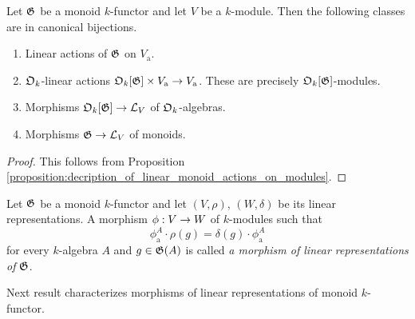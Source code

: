 \begin{corollary}\label{corollary:linear_representations_various_characterizations}
Let ${\mathfrak G}$ be a monoid $k$-functor and let $V$ be a $k$-module. Then the following classes are in canonical bijections.
\begin{enumerate}[label=\emph{\textbf{(\arabic*)}}, leftmargin=1.5em]
\item Linear actions of ${\mathfrak G}$ on $V_{\mathrm{a}}$.
\item ${\mathfrak O}_k$-linear actions ${\mathfrak O}_k[{\mathfrak G}]\times V_{\mathrm{a}}\rightarrow V_{\mathrm{a}}$. These are precisely ${\mathfrak O}_k[{\mathfrak G}]$-modules.
\item Morphisms ${\mathfrak O}_k[{\mathfrak G}]\rightarrow {\mathcal L}_V$ of ${\mathfrak O}_k$-algebras.
\item Morphisms ${\mathfrak G}\rightarrow {\mathcal L}_V$ of monoids.
\end{enumerate}
\end{corollary}
\begin{proof}
This follows from Proposition \ref{proposition:decription_of_linear_monoid_actions_on_modules}.
\end{proof}

\begin{definition}
Let ${\mathfrak G}$ be a monoid $k$-functor and let $(V,\rho)$, $(W,\delta)$ be its linear representations. A morphism $\phi:V\rightarrow W$ of $k$-modules such that
$$\phi_{\mathrm{a}}^A \cdot \rho(g) = \delta(g) \cdot \phi_{\mathrm{a}}^A$$
for every $k$-algebra $A$ and $g \in {\mathfrak G}(A)$ is called \textit{a morphism of linear representations of ${\mathfrak G}$}.
\end{definition}
\noindent
Next result characterizes morphisms of linear representations of monoid $k$-functor.

